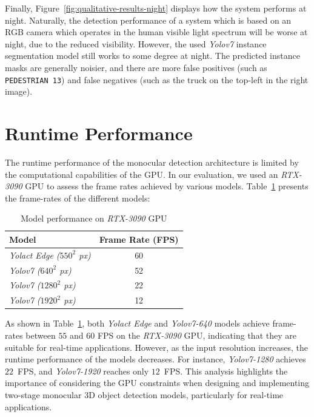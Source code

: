 Finally, Figure~\ref{fig:qualitative-results-night} displays how the system performs at night.
Naturally, the detection performance of a system which is based on an RGB camera which operates in the human visible light spectrum will be worse at night, due to the reduced visibility.
However, the used \textit{Yolov7} instance segmentation model still works to some degree at night.
The predicted instance masks are generally noisier, and there are more false positives (such as \texttt{PEDESTRIAN 13}) and false negatives (such as the truck on the top-left in the right image).


\section{Runtime Performance}
\label{sec:performance}

The runtime performance of the monocular detection architecture is limited by the computational capabilities of the GPU. In our evaluation, we used an \textit{RTX-3090} GPU to assess the frame rates achieved by various models.
Table~\ref{tbl:gpu-performance} presents the frame-rates of the different models:

\begin{table}[ht]
\centering
\caption{Model performance on \textit{RTX-3090} GPU}
\begin{tabular}{|l|c|}
\hline
\textbf{Model} & \textbf{Frame Rate (FPS)} \\
\hline
\textit{Yolact Edge ($550^2$ px)} & 60 \\
\textit{Yolov7 ($640^2$ px)} & 52 \\
\textit{Yolov7 ($1280^2$ px)} & 22 \\
\textit{Yolov7 ($1920^2$ px)} & 12 \\
\hline
\end{tabular}
\label{tbl:gpu-performance}
\end{table}

As shown in Table~\ref{tbl:gpu-performance}, both \textit{Yolact Edge} and \textit{Yolov7-640} models achieve frame-rates between $55$ and $60$ FPS on the \textit{RTX-3090} GPU, indicating that they are suitable for real-time applications.
However, as the input resolution increases, the runtime performance of the models decreases.
For instance, \textit{Yolov7-1280} achieves $22$~FPS, and \textit{Yolov7-1920} reaches only $12$~FPS.
This analysis highlights the importance of considering the GPU constraints when designing and implementing two-stage monocular 3D object detection models, particularly for real-time applications.

